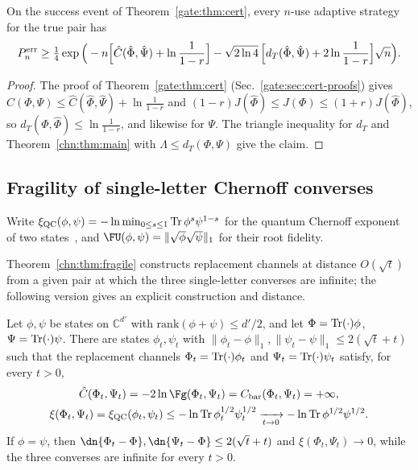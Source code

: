 \begin{corollary}\label{gate:smp:cor:finite}
On the success event of Theorem~\ref{gate:thm:cert}, every $n$-use adaptive strategy for the true pair has
\[
P^{\rm err}_n\ge\tfrac14\exp\Big(-n\Big[\hat C(\hat\Phi,\hat\Psi)+\ln\frac1{1-r}\Big]-\sqrt{2\ln4}\,\Big[d_T(\hat\Phi,\hat\Psi)+2\ln\frac1{1-r}\Big]\sqrt n\Big).
\]
\end{corollary}

\begin{proof}
The proof of Theorem~\ref{gate:thm:cert} (Sec.~\ref{gate:sec:cert-proofs}) gives $\hat C(\Phi,\Psi)\le\hat C(\hat\Phi,\hat\Psi)+\ln\frac1{1-r}$ and $(1-r)J(\hat\Phi)\le J(\Phi)\le(1+r)J(\hat\Phi)$, so $d_T(\Phi,\hat\Phi)\le\ln\frac1{1-r}$, and likewise for $\Psi$. The triangle inequality for $d_T$ and Theorem~\ref{chn:thm:main} with $\Lambda\le d_T(\Phi,\Psi)$ give the claim.
\end{proof}

\subsection*{Fragility of single-letter Chernoff converses}

Write $\xi_{\rm QC}(\phi,\psi)=-\ln\min_{0\le s\le1}\operatorname{Tr}\phi^s\psi^{1-s}$ for the quantum Chernoff exponent of two states~\cite{AudenaertChernoff2007,NussbaumSzkola2009}, and $\FU(\phi,\psi)=\|\sqrt\phi\sqrt\psi\|_1$ for their root fidelity.

Theorem~\ref{chn:thm:fragile} constructs replacement channels at distance $O(\sqrt t)$ from a given pair at which the three single-letter converses are infinite; the following version gives an explicit construction and distance.

\begin{theorem}\label{gate:smp:thm:fragile}
Let $\phi,\psi$ be states on $\mathbb C^{d'}$ with $\mathrm{rank}(\phi+\psi)\le d'/2$, and let $\Phi=\operatorname{Tr}(\cdot)\phi$, $\Psi=\operatorname{Tr}(\cdot)\psi$. There are states $\phi_t,\psi_t$ with $\|\phi_t-\phi\|_1,\|\psi_t-\psi\|_1\le2(\sqrt t+t)$ such that the replacement channels $\Phi_t=\operatorname{Tr}(\cdot)\phi_t$ and $\Psi_t=\operatorname{Tr}(\cdot)\psi_t$ satisfy, for every $t>0$,
\begin{gather*}
\hat C(\Phi_t,\Psi_t)=-2\ln\Fg(\Phi_t,\Psi_t)=C_{\rm bar}(\Phi_t,\Psi_t)=+\infty,\\
\xi(\Phi_t,\Psi_t)=\xi_{\rm QC}(\phi_t,\psi_t)\le-\ln\Tr\phi_t^{1/2}\psi_t^{1/2}\xrightarrow[t\to0]{}-\ln\Tr\phi^{1/2}\psi^{1/2}.
\end{gather*}
If $\phi=\psi$, then $\dn{\Phi_t-\Phi},\dn{\Psi_t-\Phi}\le2(\sqrt t+t)$ and $\xi(\Phi_t,\Psi_t)\to0$, while the three converses are infinite for every $t>0$.
\end{theorem}

